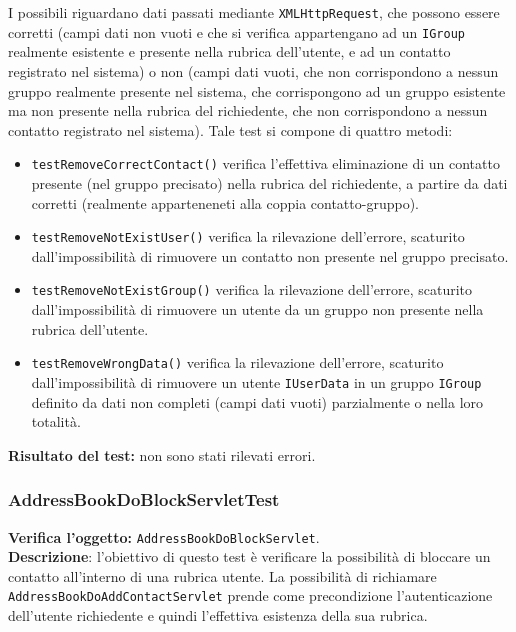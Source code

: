 I possibili  riguardano dati passati mediante \texttt{XMLHttpRequest}, che possono essere corretti (campi dati non vuoti e che si verifica appartengano ad un \texttt{IGroup} realmente esistente e presente nella rubrica dell'utente, e ad un contatto registrato nel sistema) o non (campi dati vuoti, che non corrispondono a nessun gruppo realmente presente nel sistema, che corrispongono ad un gruppo esistente ma non presente nella rubrica del richiedente, che non corrispondono a nessun contatto registrato nel sistema).
Tale test si compone di quattro metodi:
\begin{itemize}
\item \texttt{testRemoveCorrectContact()} verifica l'effettiva eliminazione di un contatto presente (nel gruppo precisato) nella rubrica del richiedente, a partire da dati corretti (realmente apparteneneti alla coppia contatto-gruppo).
\item \texttt{testRemoveNotExistUser()} verifica la rilevazione dell'errore, scaturito dall'impossibilità di rimuovere un contatto non presente nel gruppo precisato.
\item \texttt{testRemoveNotExistGroup()} verifica la rilevazione dell'errore, scaturito dall'impossibilità di rimuovere un utente da un gruppo non presente nella rubrica dell'utente.
\item \texttt{testRemoveWrongData()} verifica la rilevazione dell'errore, scaturito dall'impossibilità di rimuovere un utente \texttt{IUserData} in un gruppo \texttt{IGroup} definito da dati non completi (campi dati vuoti) parzialmente o nella loro totalità.
\end{itemize}
\textbf{Risultato del test:} non sono stati rilevati errori.

\subsubsection{AddressBookDoBlockServletTest}
\textbf{Verifica l'oggetto:} \texttt{AddressBookDoBlockServlet}.\\
\textbf{Descrizione}: l'obiettivo di questo test è verificare la possibilità di bloccare un contatto all'interno di una rubrica utente. La possibilità di richiamare \texttt{AddressBookDoAddContactServlet} prende come precondizione l'autenticazione dell'utente richiedente e quindi l'effettiva esistenza della sua rubrica.

